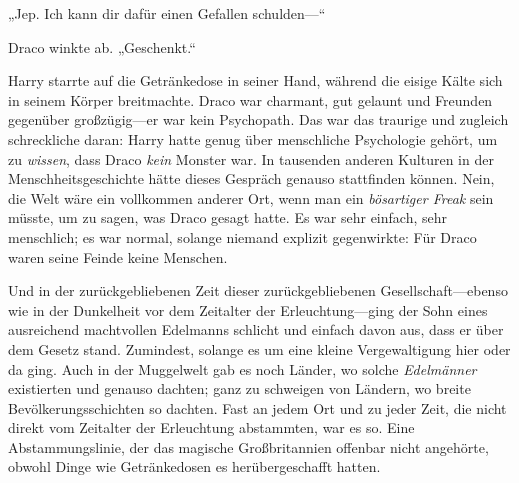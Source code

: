 „Jep. Ich kann dir dafür einen Gefallen schulden—“

Draco winkte ab. „Geschenkt.“

Harry starrte auf die Getränkedose in seiner Hand, während die eisige Kälte sich in seinem Körper breitmachte. Draco war charmant, gut gelaunt und Freunden gegenüber großzügig—er war kein Psychopath. Das war das traurige und zugleich schreckliche daran: Harry hatte genug über menschliche Psychologie gehört, um zu \emph{wissen}, dass Draco \emph{kein} Monster war. In tausenden anderen Kulturen in der Menschheitsgeschichte hätte dieses Gespräch genauso stattfinden können. Nein, die Welt wäre ein vollkommen anderer Ort, wenn man ein \emph{bösartiger Freak} sein müsste, um zu sagen, was Draco gesagt hatte. Es war sehr einfach, sehr menschlich; es war normal, solange niemand explizit gegenwirkte: Für Draco waren seine Feinde keine Menschen.

Und in der zurückgebliebenen Zeit dieser zurückgebliebenen Gesellschaft—ebenso wie in der Dunkelheit vor dem Zeitalter der Erleuchtung—ging der Sohn eines ausreichend machtvollen Edelmanns schlicht und einfach davon aus, dass er über dem Gesetz stand. Zumindest, solange es um eine kleine Vergewaltigung hier oder da ging. Auch in der Muggelwelt gab es noch Länder, wo solche \emph{Edelmänner} existierten und genauso dachten; ganz zu schweigen von Ländern, wo breite Bevölkerungsschichten so dachten. Fast an jedem Ort und zu jeder Zeit, die nicht direkt vom Zeitalter der Erleuchtung abstammten, war es so. Eine Abstammungslinie, der das magische Großbritannien offenbar nicht angehörte, obwohl Dinge wie Getränkedosen es herübergeschafft hatten.

